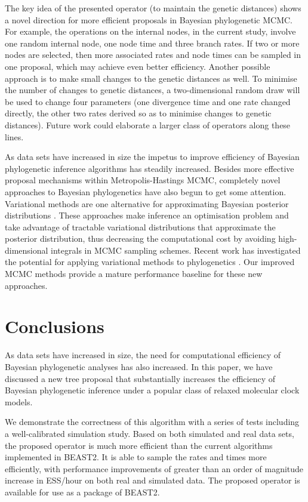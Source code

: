 \documentclass{bmcart}
\begin{document}
The key idea of the presented operator (to maintain the genetic distances) shows a novel direction for more efficient proposals in Bayesian phylogenetic MCMC. For example, the operations on the internal nodes, in the current study, involve one random internal node, one node time and three branch rates. If two or more nodes are selected, then more associated rates and node times can be sampled in one proposal, which may achieve even better efficiency. Another possible approach is to make small changes to the genetic distances as well. To minimise the number of changes to genetic distances, a two-dimensional random draw will be used to change four parameters (one divergence time and one rate changed directly, the other two rates derived so as to minimise changes to genetic distances). Future work could elaborate a larger class of operators along these lines.

As data sets have increased in size the impetus to improve efficiency of Bayesian phylogenetic inference algorithms has steadily increased. Besides more effective proposal mechanisms within Metropolis-Hastings MCMC, completely novel approaches to Bayesian phylogenetics have also begun to get some attention. Variational methods are one alternative for approximating Bayesian posterior distributions \cite{beal2003variational}. These approaches make inference an optimisation problem and take advantage of tractable variational distributions that approximate the posterior distribution, thus decreasing the computational cost by avoiding high-dimensional integrals in MCMC sampling schemes. Recent work has investigated the potential for applying variational methods to phylogenetics \cite{zhang2018variational,dang2019stochastic}. Our improved MCMC methods provide a mature performance baseline for these new approaches.

\section*{Conclusions}
As data sets have increased in size, the need for computational efficiency of Bayesian phylogenetic analyses has also increased. In this paper, we have discussed a new tree proposal that substantially increases the efficiency of Bayesian phylogenetic inference under a popular class of relaxed molecular clock models.

We demonstrate the correctness of this algorithm with a series of tests including a well-calibrated simulation study. Based on both simulated and real data sets, the proposed operator is much more efficient than the current algorithms implemented in BEAST2. It is able to sample the rates and times more efficiently, with performance improvements of greater than an order of magnitude increase in ESS/hour on both real and simulated data. The proposed operator is available for use as a package of BEAST2.
\end{document}
